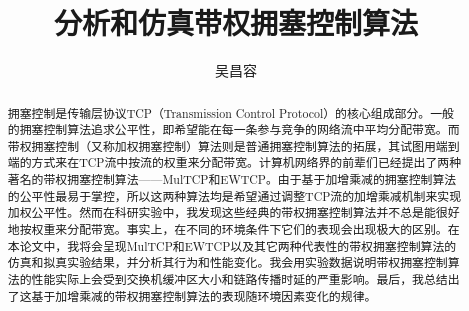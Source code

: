 \documentclass[winfonts]{njuthesis}
\title{分析和仿真带权拥塞控制算法}
\author{吴昌容}
\begin{document}
\maketitle
\controlpage %

\begin{abstract}
  拥塞控制是传输层协议TCP（Transmission Control Protocol）的核心组成部分。一般的拥塞控制算法追求公平性，即希望能在每一条参与竞争的网络流中平均分配带宽。而带权拥塞控制（又称加权拥塞控制）算法则是普通拥塞控制算法的拓展，其试图用端到端的方式来在TCP流中按流的权重来分配带宽。计算机网络界的前辈们已经提出了两种著名的带权拥塞控制算法——MulTCP和EWTCP。由于基于加增乘减的拥塞控制算法的公平性最易于掌控，所以这两种算法均是希望通过调整TCP流的加增乘减机制来实现加权公平性。然而在科研实验中，我发现这些经典的带权拥塞控制算法并不总是能很好地按权重来分配带宽。事实上，在不同的环境条件下它们的表现会出现极大的区别。在本论文中，我将会呈现MulTCP和EWTCP以及其它两种代表性的带权拥塞控制算法的仿真和拟真实验结果，并分析其行为和性能变化。我会用实验数据说明带权拥塞控制算法的性能实际上会受到交换机缓冲区大小和链路传播时延的严重影响。最后，我总结出了这基于加增乘减的带权拥塞控制算法的表现随环境因素变化的规律。
\end{abstract}
\end{document}

